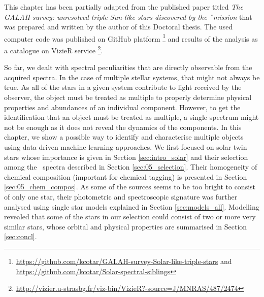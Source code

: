 This chapter has been partially adapted from the published paper titled \textit{The GALAH survey: unresolved triple Sun-like stars discovered by the \G\ mission} \citep{2019MNRAS.487.2474C} that was prepared and written by the author of this Doctoral thesis. The used computer code was published on GitHub platform  \footnote{\url{https://github.com/kcotar/GALAH-survey-Solar-like-triple-stars} and \url{https://github.com/kcotar/Solar-spectral-siblings}} and results of the analysis as a catalogue on VizieR service  \footnote{\url{http://vizier.u-strasbg.fr/viz-bin/VizieR?-source=J/MNRAS/487/2474}}.

So far, we dealt with spectral peculiarities that are directly observable from the acquired spectra. In the case of multiple stellar systems, that might not always be true. As all of the stars in a given system contribute to light received by the observer, the object must be treated as multiple to properly determine physical properties and abundances of an individual component. However, to get the identification that an object must be treated as multiple, a single spectrum might not be enough as it does not reveal the dynamics of the components. In this chapter, we show a possible way to identify and characterise multiple objects using data-driven machine learning approaches. We first focused on solar twin stars whose importance is given in Section \ref{sec:intro_solar} and their selection among the \Gh\ spectra described in Section \ref{sec:05_selection}. Their homogeneity of chemical composition (important for chemical tagging) is presented in Section \ref{sec:05_chem_compos}. As some of the sources seems to be too bright to consist of only one star, their photometric and spectroscopic signature was further analysed using single star models explained in Section \ref{sec:models_all}. Modelling revealed that some of the stars in our selection could consist of two or more very similar stars, whose orbital and physical properties are summarised in Section \ref{sec:concl}. 
 

